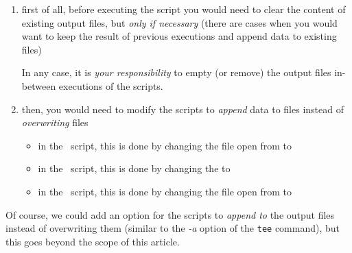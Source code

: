 \begin{enumerate}
	\item first of all, before executing the script you would need to clear the content of existing output files, but \emph{only if necessary} (there are cases when you would want to keep the result of previous executions and append data to existing files)
	
	In any case, it is \emph{your responsibility} to empty (or remove) the output files in-between executions of the scripts.
	
	\item  then, you would need to modify the scripts to \emph{append} data to files instead of \emph{overwriting} files
	
	\begin{itemize}
		\item in the \python\ script, this is done by changing the file open  from  to 
		\item in the \gawk\ script, this is done by changing the  to \newline
		\item in the \perl\ script, this is done by changing the file open  from  to 
	\end{itemize}
\end{enumerate}

Of course, we could add an option for the scripts to \emph{append to} the output files instead of overwriting them (similar to the \emph{-a} option of the \texttt{tee} command), but this goes beyond the scope of this article.
